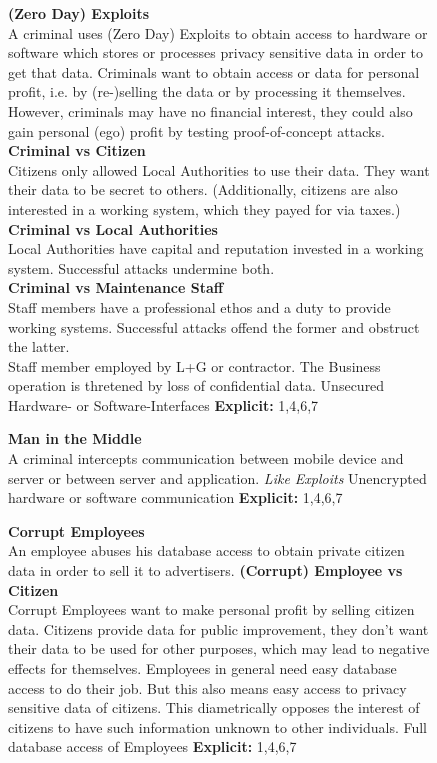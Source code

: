 \begin{landscape}
\begin{figure}
\centering
\begin{ThreatTable}

\ThreatTableContentRow
{\textbf{(Zero Day) Exploits}
\\A criminal uses (Zero Day) Exploits to obtain access to hardware or software which stores or processes
privacy sensitive data in order to get that data.}
{Criminals want to obtain access or data for personal profit, i.e. by (re-)selling the data or  by processing it themselves. 
However, criminals may have no financial interest, they could also gain personal (ego) profit by testing proof-of-concept attacks.
\\\textbf{Criminal vs Citizen}
\\Citizens only allowed Local Authorities to use their data. They want their data to be secret to others. (Additionally, citizens are
also interested in a working system, which they payed for via taxes.)
\\\textbf{Criminal vs Local Authorities}
\\Local Authorities have capital and reputation invested in a working system. Successful attacks undermine both.
\\\textbf{Criminal vs Maintenance Staff}
\\Staff members have a professional ethos and a duty to provide working systems. Successful attacks offend the former and obstruct the latter.
\\Staff member employed by L+G or contractor. The Business operation is thretened by loss of confidential data.
}
{Unsecured Hardware- or Software-Interfaces}
{\textbf{Explicit:} 1,4,6,7}

\ThreatTableContentRow
{\textbf{Man in the Middle} 
\\A criminal intercepts communication between mobile device and server or between server and application.}
{\textit{Like Exploits}}
{Unencrypted hardware or software communication}
{\textbf{Explicit:} 1,4,6,7}

\ThreatTableContentRow
{\textbf{Corrupt Employees} 
\\ An employee abuses his database access to obtain private citizen data in order to sell it to advertisers.}
{\textbf{(Corrupt) Employee vs Citizen} 
\\ Corrupt Employees want to make personal profit by selling citizen data. 
Citizens provide data for public improvement, they don't want their data to be used for other purposes, which
may lead to negative effects for themselves.
Employees in general need easy database access to do their job. But this also means easy access to privacy
sensitive data of citizens. This diametrically opposes the interest of citizens to have such information unknown
to other individuals.}
{Full database access of Employees}
{\textbf{Explicit:} 1,4,6,7}


\end{ThreatTable}
\end{figure}
\end{landscape}
